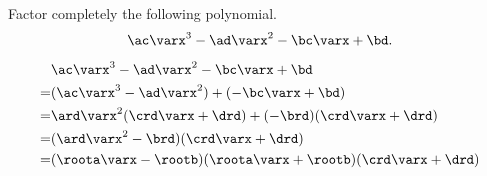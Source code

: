

\pgfmathtruncatemacro{\a}{\roota*\roota} 
\pgfmathtruncatemacro{\b}{\rootb*\rootb} 




\pgfmathtruncatemacro{\ac}{\ard*\crd}
\pgfmathtruncatemacro{\ad}{\ard*\drd}
\pgfmathtruncatemacro{\bc}{\brd*\crd}
\pgfmathtruncatemacro{\bd}{\brd*\drd}



\edef\varxy{\varx}

\edef\varab{\vara}

\edef\varpq{\varb}

\edef\varmn{\vary}








Factor completely the following polynomial.
\[\ac\varx^3  -{\ad}\varx^2 - {\bc}\varx +\bd.\]

\begin{solution}
\[\begin{split}
&\ac\varx^3  -{\ad}\varx^2 - {\bc}\varx +\bd\\
=&(\ac\varx^3 -{\ad}\varx^2) + (-{\bc}\varx+\bd)\\
=&\ard\varx^2(\crd\varx + {\drd})+ (-\brd)(\crd\varx+{\drd})\\
=&(\ard\varx^2 - {\brd})(\crd\varx + {\drd})\\
=&(\roota\varx - \rootb)(\roota\varx + \rootb)(\crd\varx + {\drd})
\end{split}
\]
\end{solution}